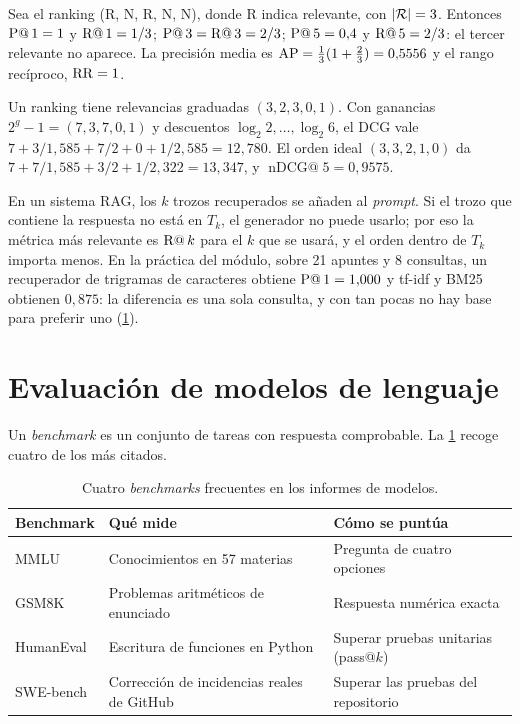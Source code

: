 \begin{ejemplo}\label{ej:ranking}
Sea el ranking (R, N, R, N, N), donde R indica relevante, con $\lvert\mathcal{R}\rvert=3$. Entonces $\operatorname{P@}1=1$ y $\operatorname{R@}1=1/3$; $\operatorname{P@}3=\operatorname{R@}3=2/3$; $\operatorname{P@}5=0{,}4$ y $\operatorname{R@}5=2/3$: el tercer relevante no aparece. La precisión media es $\operatorname{AP}=\frac13(1+\frac23)=0{,}5556$ y el rango recíproco, $\operatorname{RR}=1$.
\end{ejemplo}

\begin{ejemplo}[nDCG]\label{ej:ndcg}
Un ranking tiene relevancias graduadas $(3,2,3,0,1)$. Con ganancias $2^{g}-1=(7,3,7,0,1)$ y descuentos $\log_2 2,\dots,\log_2 6$, el DCG vale $7+3/1{,}585+7/2+0+1/2{,}585=12{,}780$. El orden ideal $(3,3,2,1,0)$ da $7+7/1{,}585+3/2+1/2{,}322=13{,}347$, y $\operatorname{nDCG@}5=0{,}9575$.
\end{ejemplo}

\begin{observacion}\label{obs:recall-rag}
En un sistema RAG, los $k$ trozos recuperados se añaden al \emph{prompt}. Si el trozo que contiene la respuesta no está en $T_k$, el generador no puede usarlo; por eso la métrica más relevante es $\operatorname{R@}k$ para el $k$ que se usará, y el orden dentro de $T_k$ importa menos. En la práctica del módulo, sobre 21 apuntes y 8 consultas, un recuperador de trigramas de caracteres obtiene $\operatorname{P@}1=1{,}000$ y tf-idf y BM25 obtienen $0{,}875$: la diferencia es una sola consulta, y con tan pocas no hay base para preferir uno (\cref{sec:se}).
\end{observacion}

\section{Evaluación de modelos de lenguaje}
\label{sec:se}

Un \emph{benchmark} es un conjunto de tareas con respuesta comprobable. La \cref{tab:benchmarks} recoge cuatro de los más citados.

\begin{table}[h]
\centering\small
\begin{tabularx}{\textwidth}{@{}l>{\raggedright\arraybackslash}X>{\raggedright\arraybackslash}X@{}}
\toprule
Benchmark & Qué mide & Cómo se puntúa \\
\midrule
MMLU~\cite{mmlu} & Conocimientos en 57 materias & Pregunta de cuatro opciones \\
GSM8K~\cite{gsm8k} & Problemas aritméticos de enunciado & Respuesta numérica exacta \\
HumanEval~\cite{chen-codex} & Escritura de funciones en Python & Superar pruebas unitarias (pass@$k$) \\
SWE-bench~\cite{swebench} & Corrección de incidencias reales de GitHub & Superar las pruebas del repositorio \\
\bottomrule
\end{tabularx}
\caption{Cuatro \emph{benchmarks} frecuentes en los informes de modelos.}
\label{tab:benchmarks}
\end{table}

